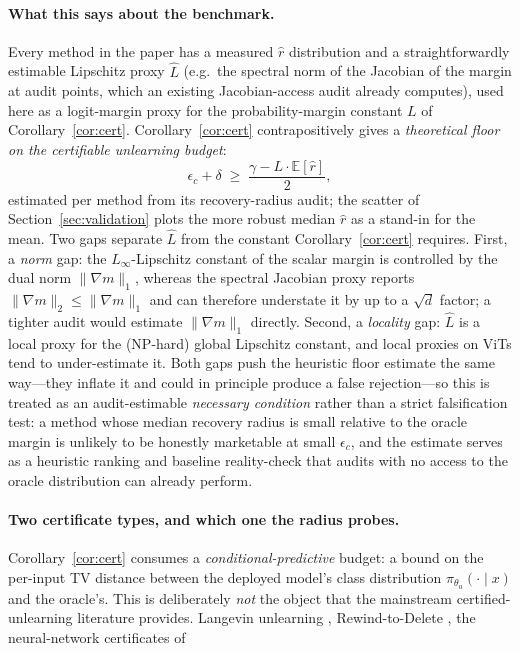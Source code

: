 \paragraph{What this says about the benchmark.}
Every method in the paper has a measured $\hat r$ distribution and a
straightforwardly estimable Lipschitz proxy $\hat L$ (e.g.\ the spectral
norm of the Jacobian of the margin at audit points, which an existing
Jacobian-access audit already computes), used here as a logit-margin proxy for the
probability-margin constant $L$ of Corollary~\ref{cor:cert}. Corollary~\ref{cor:cert} contrapositively gives a
\emph{theoretical floor on the certifiable unlearning budget}:
\[
  \epsilon_c + \delta \;\geq\; \frac{\gamma - L\cdot \mathbb{E}[\hat r]}{2},
\]
estimated per method from its recovery-radius audit; the scatter of
Section~\ref{sec:validation} plots the more robust median $\hat r$ as a stand-in
for the mean.
Two gaps separate $\hat L$ from the constant Corollary~\ref{cor:cert} requires.
First, a \emph{norm} gap: the $L_\infty$-Lipschitz constant of the scalar
margin is controlled by the dual norm $\|\nabla m\|_1$, whereas the spectral
Jacobian proxy reports $\|\nabla m\|_2 \leq \|\nabla m\|_1$ and can therefore
understate it by up to a $\sqrt{d}$ factor; a tighter audit would estimate
$\|\nabla m\|_1$ directly. Second, a \emph{locality} gap: $\hat L$ is a local
proxy for the (NP-hard) global Lipschitz constant, and local proxies on ViTs
tend to under-estimate it. Both gaps push the heuristic floor estimate the same
way---they inflate it and could in principle produce a false rejection---so this is treated as an
audit-estimable \emph{necessary condition} rather than a strict falsification
test: a method whose median recovery radius is small relative to the oracle
margin is unlikely to be honestly marketable at small $\epsilon_c$, and the
estimate serves as a heuristic ranking and baseline reality-check that audits with
no access to the oracle distribution can already perform. \paragraph{Two certificate types, and which one the radius probes.}
Corollary~\ref{cor:cert} consumes a \emph{conditional-predictive} budget: a
bound on the per-input TV distance between the deployed model's class
distribution $\pi_{\theta_u}(\cdot\mid x)$ and the oracle's. This is
deliberately \emph{not} the object that the mainstream certified-unlearning
literature provides. Langevin unlearning \cite{chien2024langevin},
Rewind-to-Delete \cite{mu2025rewind}, the neural-network certificates of
